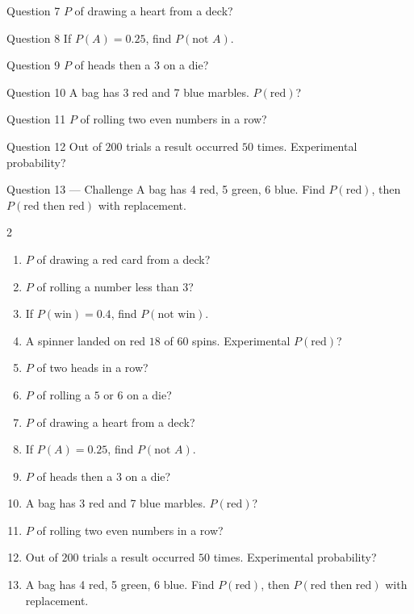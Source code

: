 \documentclass[11pt]{article}
\begin{document}
\begin{qbox}{Question 7}
$P$ of drawing a heart from a deck?\workspace{2.4cm}
\end{qbox}

\begin{qbox}{Question 8}
If $P(A)=0.25$, find $P(\text{not }A)$.\workspace{2.4cm}
\end{qbox}

\begin{qbox}{Question 9}
$P$ of heads then a $3$ on a die?\workspace{2.4cm}
\end{qbox}

\begin{qbox}{Question 10}
A bag has 3 red and 7 blue marbles. $P(\text{red})$?\workspace{2.4cm}
\end{qbox}

\begin{qbox}{Question 11}
$P$ of rolling two even numbers in a row?\workspace{2.4cm}
\end{qbox}

\begin{qbox}{Question 12}
Out of $200$ trials a result occurred $50$ times. Experimental probability?\workspace{2.4cm}
\end{qbox}

\begin{qbox}{Question 13 --- Challenge}
A bag has 4 red, 5 green, 6 blue. Find $P(\text{red})$, then $P(\text{red then red})$ with replacement.\workspace{3cm}
\end{qbox}

\clearpage
{}

\begin{recapbox}
\begin{multicols}{2}
\small
\begin{enumerate}[leftmargin=*,itemsep=3pt]
  \item $P$ of drawing a red card from a deck?
  \item $P$ of rolling a number less than $3$?
  \item If $P(\text{win})=0.4$, find $P(\text{not win})$.
  \item A spinner landed on red $18$ of $60$ spins. Experimental $P(\text{red})$?
  \item $P$ of two heads in a row?
  \item $P$ of rolling a $5$ or $6$ on a die?
  \item $P$ of drawing a heart from a deck?
  \item If $P(A)=0.25$, find $P(\text{not }A)$.
  \item $P$ of heads then a $3$ on a die?
  \item A bag has 3 red and 7 blue marbles. $P(\text{red})$?
  \item $P$ of rolling two even numbers in a row?
  \item Out of $200$ trials a result occurred $50$ times. Experimental probability?
  \item A bag has 4 red, 5 green, 6 blue. Find $P(\text{red})$, then $P(\text{red then red})$ with replacement.
\end{enumerate}
\end{multicols}
\end{recapbox}
\end{document}
